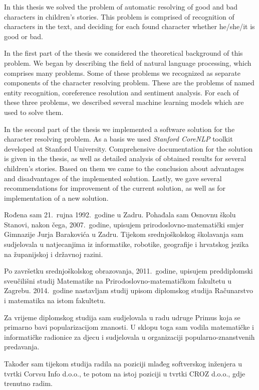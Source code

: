 \documentclass[a4paper,twoside,12pt]{memoir} %
\newcommand{\ti}[1]{\textit{#1\/}}
\begin{document}
\begin{summary}

	In this thesis we solved the problem of automatic resolving of good and bad characters in children's stories. This problem is comprised of recognition of characters in the text, and deciding for each found character whether he/she/it is good or bad.

	In the first part of the thesis we considered the theoretical background of this problem. We began by describing the field of natural language processing, which comprises many problems. Some of these problems we recognized as separate components of the character resolving problem. These are the problems of named entity recognition, coreference resolution and sentiment analysis. For each of these three problems, we described several machine learning models which are used to solve them.

	In the second part of the thesis we implemented a software solution for the character resolving problem. As a basis we used \ti{Stanford CoreNLP}
	toolkit developed at Stanford University. Comprehensive documentation for the solution is given in the thesis, as well as detailed analysis of obtained results for several children's stories. Based on them we came to the conclusion about advantages and disadvantages of the implemented solution. Lastly, we gave several recommendations for improvement of the current solution, as well as for implementation of a new solution.

\end{summary}

\begin{cv}

	Rođena sam 21.~rujna 1992.~godine u Zadru. Pohađala sam Osnovnu školu \hbox{Stanovi}, nakon čega, 2007.~godine, upisujem prirodoslovno-matematički smjer Gimnazije Jurja Barakovića u Zadru. Tijekom srednjoškolskog školavanja sam sudjelovala u natjecanjima iz informatike, robotike, geografije i hrvatskog jezika na županijskoj i državnoj razini.

	Po završetku srednjoškolskog obrazovanja, 2011.~godine, upisujem preddiplomski sveučilišni studij Matematike na Prirodoslovno-matematičkom fakultetu u Zagrebu. 2014.~godine nastavljam studij upisom diplomskog studija Računarstvo i matematika na istom fakultetu.

	Za vrijeme diplomskog studija sam sudjelovala u radu udruge Primus koja se primarno bavi popularizacijom znanosti. U sklopu toga sam vodila matematičke i informatičke radionice za djecu i sudjelovala u organizaciji popularno-znanstvenih predavanja.

	Također sam tijekom studija radila na poziciji mlađeg softverskog inženjera u tvrtki Corvsu Info d.o.o., te potom na istoj poziciji u tvrtki CROZ d.o.o., gdje trenutno radim.

\end{cv}
\end{document}
